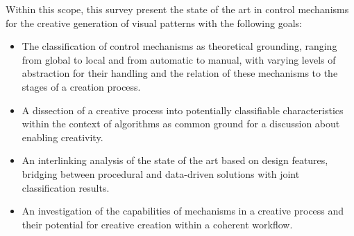 Within this scope, this survey present the state of the art in control mechanisms for the creative generation of visual patterns with the following goals:


\begin{itemize}
    \item The classification of control mechanisms as theoretical grounding, ranging from global to local and from automatic to manual, with varying levels of abstraction for their handling and the relation of these mechanisms to the stages of a creation process. 
    \item A dissection of a creative process into potentially classifiable characteristics within the context of algorithms as common ground for a discussion about enabling creativity.
    \item An interlinking analysis of the state of the art based on design features, bridging between procedural and data-driven solutions with joint classification results. 
    \item An investigation of the capabilities of mechanisms in a creative process and their potential for creative creation within a coherent workflow.
\end{itemize}
